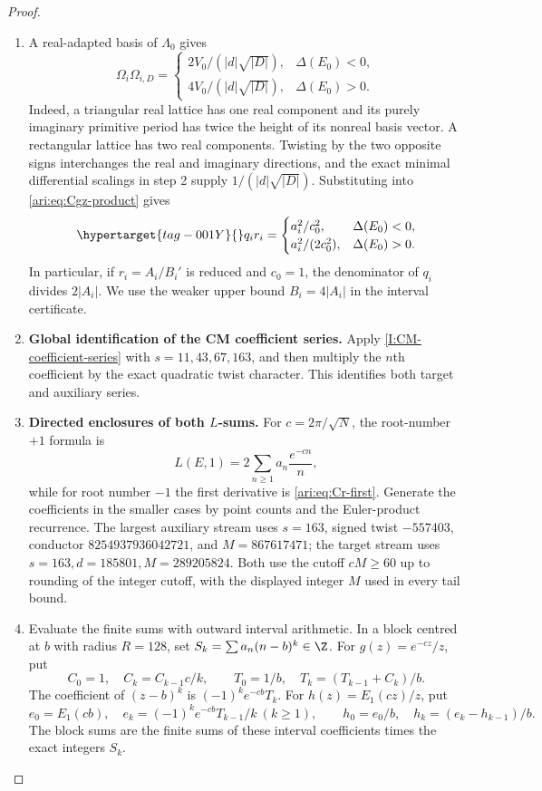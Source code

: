 \begin{proof}
\begin{enumerate}[label=\arabic*.,leftmargin=*]
\item A real-adapted basis of $\Lambda_0$ gives
\[
 \Omega_i\Omega_{i,D}=
 \begin{cases}
 2V_0/(|d|\sqrt{|D|}),&\Delta(E_0)<0,\\
 4V_0/(|d|\sqrt{|D|}),&\Delta(E_0)>0.
 \end{cases}
\]
Indeed, a triangular real lattice has one real component and its
purely imaginary primitive period has twice the height of its
nonreal basis vector. A rectangular lattice has two real
components. Twisting by the two opposite signs interchanges the
real and imaginary directions, and the exact minimal differential
scalings in step 2 supply $1/(|d|\sqrt{|D|})$.
Substituting into \eqref{ari:eq:Cgz-product} gives
\begin{equation}\hypertarget{tag-001Y}{}\label{ari:eq:Cgz-denominator}
 q_ir_i=
 \begin{cases}
 a_i^2/c_0^2,&\Delta(E_0)<0,\\
 a_i^2/(2c_0^2),&\Delta(E_0)>0.
 \end{cases}
\end{equation}
In particular, if $r_i=A_i/B_i'$ is reduced and $c_0=1$, the
denominator of $q_i$ divides $2|A_i|$. We use the weaker upper
bound $B_i=4|A_i|$ in the interval certificate.

\item \textbf{Global identification of the CM coefficient series.}
Apply \cref{I:CM-coefficient-series} with $s=11,43,67,163$,
and then multiply the $n$th coefficient by the exact quadratic
twist character. This identifies both target and auxiliary series.

\item \textbf{Directed enclosures of both $L$-sums.}
For $c=2\pi/\sqrt N$, the root-number $+1$ formula is
\[
 L(E,1)=2\sum_{n\geq1}a_n\frac{e^{-cn}}n,
\]
while for root number $-1$ the first derivative is
\eqref{ari:eq:Cr-first}. Generate the coefficients in the smaller cases by point counts
and the Euler-product recurrence. The largest auxiliary stream uses
$s=163$, signed twist $-557403$, conductor
$8254937936042721$, and $M=867617471$; the target stream uses
$s=163,d=185801,M=289205824$. Both use the cutoff $cM\geq60$
up to rounding of the integer cutoff, with the displayed integer
$M$ used in every tail bound.

\item Evaluate the finite sums with outward interval arithmetic.
In a block centred at $b$ with radius $R=128$, set
$S_k=\sum a_n(n-b)^k\in\Z$. For $g(z)=e^{-cz}/z$, put
\[
 C_0=1,\quad C_k=C_{k-1}c/k,\qquad
 T_0=1/b,\quad T_k=(T_{k-1}+C_k)/b.
\]
The coefficient of $(z-b)^k$ is $(-1)^ke^{-cb}T_k$.
For $h(z)=E_1(cz)/z$, put
\[
 e_0=E_1(cb),\quad e_k=(-1)^ke^{-cb}T_{k-1}/k\ (k\geq1),
 \qquad h_0=e_0/b,\quad h_k=(e_k-h_{k-1})/b.
\]
The block sums are the finite sums of these interval coefficients
times the exact integers $S_k$.


\end{enumerate}
\end{proof}
